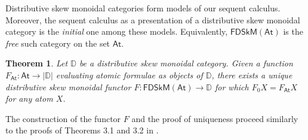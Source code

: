 \documentclass[submission,copyright,creativecommons]{eptcs}
\newtheorem{theorem}{Theorem}[section]
\theoremstyle{definition}
\newcommand{\FSkMCC}{\mathsf{FDSkM}}
\begin{document}
Distributive skew monoidal categories form models of our sequent calculus.
Moreover, the sequent calculus as a presentation of a distributive skew monoidal category is the \emph{initial} one among these
models. Equivalently, $\FSkMCC(\mathsf{At})$ is the \emph{free}
such category on the set $\mathsf{At}$.
\begin{theorem}\label{thm:models}
  Let $\mathbb{D}$ be a distributive skew monoidal category. Given a function $F_{\mathsf{At}} : \mathsf{At} \rightarrow |\mathbb{D}|$ evaluating atomic formulae as objects of $\mathbb{D}$, there exists a unique distributive skew monoidal functor $F : \FSkMCC(\mathsf{At}) \rightarrow \mathbb{D}$ for which $F_0 X = F_{\mathsf{At}} X$ for any atom $X$.
\end{theorem}
The construction of the functor $F$ and the proof of uniqueness proceed similarly to the proofs of Theorems 3.1 and 3.2 in \cite{UVW:protsn}.
\end{document}

